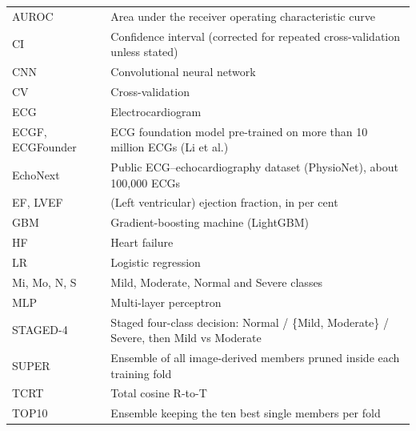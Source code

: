 \clearpage
\fancyhead[L]{\nouppercase{\leftmark}}\fancyhead[R]{\thepage}

\renewcommand{\contentsname}{Contents}
\begingroup\setstretch{\liststretch}
\tableofcontents
\clearpage
{}
\listoffigures
\clearpage
{}
\listoftables
\clearpage
\endgroup

\clearpage
\begingroup\setstretch{\liststretch}
\thispagestyle{fancy}
\vspace*{7pt}%
\newcommand{\abbrtable}[1]{\noindent\hspace*{18pt}\begin{tabular}{@{}>{\raggedright\arraybackslash}p{2.6cm}@{\hspace{12pt}}>{\raggedright\arraybackslash}p{\dimexpr\linewidth-18pt-2.6cm-12pt\relax}@{}}#1\end{tabular}\par}
\abbrtable{%
AUROC & Area under the receiver operating characteristic curve\\
CI & Confidence interval (corrected for repeated cross-validation unless stated)\\
CNN & Convolutional neural network\\
CV & Cross-validation\\
ECG & Electrocardiogram\\
ECGF, ECGFounder & ECG foundation model pre-trained on more than 10 million ECGs (Li et al.)\\
EchoNext & Public ECG--echocardiography dataset (PhysioNet), about 100,000 ECGs\\
EF, LVEF & (Left ventricular) ejection fraction, in per cent\\
GBM & Gradient-boosting machine (LightGBM)\\
HF & Heart failure\\
LR & Logistic regression\\
Mi, Mo, N, S & Mild, Moderate, Normal and Severe classes\\
MLP & Multi-layer perceptron\\
STAGED-4 & Staged four-class decision: Normal / \{Mild, Moderate\} / Severe, then Mild vs Moderate\\
SUPER & Ensemble of all image-derived members pruned inside each training fold\\
TCRT & Total cosine R-to-T\\
TOP10 & Ensemble keeping the ten best single members per fold\\
}

